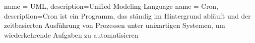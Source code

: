 %
%

{ 
    name = UML, 
    description={Unified Modeling Language}
}
{
    name = Cron,
    description={Cron ist ein Programm, das ständig im Hintergrund abläuft und der zeitbasierten Ausführung von Prozessen unter unixartigen Systemen, um wiederkehrende Aufgaben zu automatisieren}
}